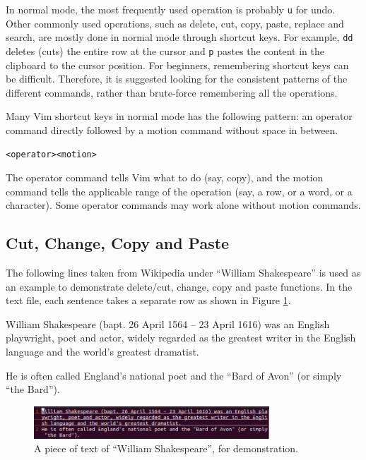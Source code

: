 In normal mode, the most frequently used operation is probably \verb|u| for undo. Other commonly used operations, such as delete, cut, copy, paste, replace and search, are mostly done in normal mode through shortcut keys. For example, \verb|dd| deletes (cuts) the entire row at the cursor and \verb|p| pastes the content in the clipboard to the cursor position. For beginners, remembering shortcut keys can be difficult. Therefore, it is suggested looking for the consistent patterns of the different commands, rather than brute-force remembering all the operations.

Many Vim shortcut keys in normal mode has the following pattern: an operator command directly followed by a motion command without space in between.
\begin{lstlisting}
<operator><motion>
\end{lstlisting}
The operator command tells Vim what to do (say, copy), and the motion command tells the applicable range of the operation (say, a row, or a word, or a character). Some operator commands may work alone without motion commands.

\subsection{Cut, Change, Copy and Paste}

The following lines taken from Wikipedia under ``William Shakespeare'' is used as an example to demonstrate delete/cut, change, copy and paste functions. In the text file, each sentence takes a separate row as shown in Figure \ref{ch:tfe:fig:vimdemo1}.

\begin{shortbox}
William Shakespeare (bapt. 26 April 1564 – 23 April 1616) was an English playwright, poet and actor, widely regarded as the greatest writer in the English language and the world's greatest dramatist.

He is often called England's national poet and the ``Bard of Avon'' (or simply ``the Bard'').
\end{shortbox}

\begin{figure}[htbp]
\centering
\includegraphics[width=250pt]{chapters/part-1/figures/vimdemo1.png}
\caption{A piece of text of ``William Shakespeare'', for demonstration.} \label{ch:tfe:fig:vimdemo1}
\end{figure}

